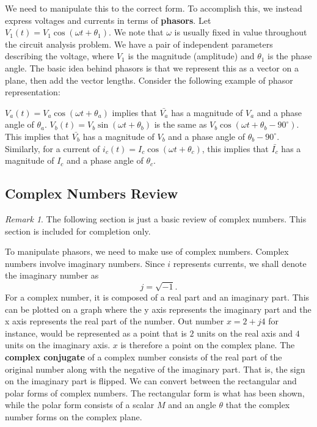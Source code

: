 \documentclass[11pt]{article}
\theoremstyle{plain} %
\theoremstyle{definition}
\theoremstyle{example}
\theoremstyle{remark}
\newtheorem*{remark}{Remark}
\begin{document}
We need to manipulate this to the correct form. To accomplish this, we instead express voltages and currents in terms of \textbf{phasors}. Let $V_1(t) = V_1\cos(\omega t + \theta_1)$. We note that $\omega$ is usually fixed in value throughout the circuit analysis problem. We have a pair of independent parameters describing the voltage, where $V_1$ is the magnitude (amplitude) and $\theta_1$ is the phase angle. The basic idea behind phasors is that we represent this as a vector on a plane, then add the vector lengths. Consider the following example of phasor representation:

$V_a(t) = V_a\cos(\omega t + \theta_a) $ implies that $ \bar{V_a}$ has a magnitude of $V_a$ and a phase angle of $\theta_a$. $V_b(t) = V_b\sin(\omega t + \theta_b)$ is the same as $V_b\cos(\omega t + \theta_b - 90^{\circ})$. This implies that $\bar{V_b}$ has a magnitude of $V_b$ and a phase angle of $\theta_b-90^{\circ}$. Similarly, for a current of $i_c(t) = I_c\cos(\omega t + \theta_c)$, this implies that $\bar{I_c}$ has a magnitude of $I_c$ and a phase angle of $\theta_c$. 


\subsection{Complex Numbers Review}
\begin{remark}
The following section is just a basic review of complex numbers. This section is included for completion only.
\end{remark}
To manipulate phasors, we need to make use of complex numbers. Complex numbers involve imaginary numbers. Since $i$ represents currents, we shall denote the imaginary number as $$j = \sqrt{-1}.$$
For a complex number, it is composed of a real part and an imaginary part. This can be plotted on a graph where the y axis represents the imaginary part and the x axis represents the real part of the number. Out number $x=2+j4$ for instance, would be represented as a point that is $2$ units on the real axis and $4$ units on the imaginary axis. $x$ is therefore a point on the complex plane. The \textbf{complex conjugate} of a complex number consists of the real part of the original number along with the negative of the imaginary part. That is, the sign on the imaginary part is flipped. We can convert between the rectangular and polar forms of complex numbers. The rectangular form is what has been shown, while the polar form consists of a scalar $M$ and an angle $\theta$ that the complex number forms on the complex plane. 
\end{document}
